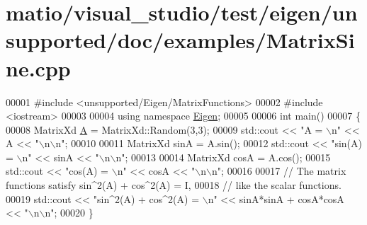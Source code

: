 \hypertarget{matio_2visual__studio_2test_2eigen_2unsupported_2doc_2examples_2_matrix_sine_8cpp_source}{}\section{matio/visual\+\_\+studio/test/eigen/unsupported/doc/examples/\+Matrix\+Sine.cpp}
\label{matio_2visual__studio_2test_2eigen_2unsupported_2doc_2examples_2_matrix_sine_8cpp_source}

\begin{DoxyCode}
00001 \textcolor{preprocessor}{#include <unsupported/Eigen/MatrixFunctions>}
00002 \textcolor{preprocessor}{#include <iostream>}
00003 
00004 \textcolor{keyword}{using namespace }\hyperlink{namespace_eigen}{Eigen};
00005 
00006 \textcolor{keywordtype}{int} main()
00007 \{
00008   MatrixXd \hyperlink{group___core___module_class_eigen_1_1_matrix}{A} = MatrixXd::Random(3,3);
00009   std::cout << \textcolor{stringliteral}{"A = \(\backslash\)n"} << A << \textcolor{stringliteral}{"\(\backslash\)n\(\backslash\)n"};
00010 
00011   MatrixXd sinA = A.sin();
00012   std::cout << \textcolor{stringliteral}{"sin(A) = \(\backslash\)n"} << sinA << \textcolor{stringliteral}{"\(\backslash\)n\(\backslash\)n"};
00013 
00014   MatrixXd cosA = A.cos();
00015   std::cout << \textcolor{stringliteral}{"cos(A) = \(\backslash\)n"} << cosA << \textcolor{stringliteral}{"\(\backslash\)n\(\backslash\)n"};
00016   
00017   \textcolor{comment}{// The matrix functions satisfy sin^2(A) + cos^2(A) = I, }
00018   \textcolor{comment}{// like the scalar functions.}
00019   std::cout << \textcolor{stringliteral}{"sin^2(A) + cos^2(A) = \(\backslash\)n"} << sinA*sinA + cosA*cosA << \textcolor{stringliteral}{"\(\backslash\)n\(\backslash\)n"};
00020 \}
\end{DoxyCode}
